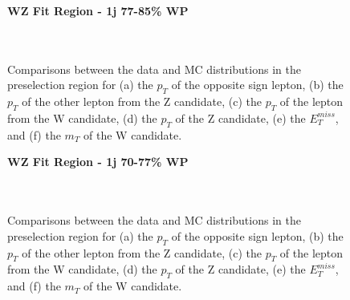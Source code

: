 \begin{figure}[H] 
    \centering
    \textbf{WZ Fit Region - 1j 77-85\% WP}\\
    \\
    \\
    \caption{Comparisons between the data and MC distributions in the preselection region for (a) the $p_T$ of the opposite sign lepton, (b) the $p_T$ of the other lepton from the Z candidate, (c) the $p_T$ of the lepton from the W candidate, (d) the $p_T$ of the Z candidate, (e) the $E_T^{miss}$, and (f) the $m_T$ of the W candidate.}
    \label{kin:WP_1j_77_85}
\end{figure}

\begin{figure}[H] 
    \centering
    \textbf{WZ Fit Region - 1j 70-77\% WP}\\
    \\
    \\
    \caption{Comparisons between the data and MC distributions in the preselection region for (a) the $p_T$ of the opposite sign lepton, (b) the $p_T$ of the other lepton from the Z candidate, (c) the $p_T$ of the lepton from the W candidate, (d) the $p_T$ of the Z candidate, (e) the $E_T^{miss}$, and (f) the $m_T$ of the W candidate.}
    \label{kin:WP_1j_70_77}   
\end{figure}

